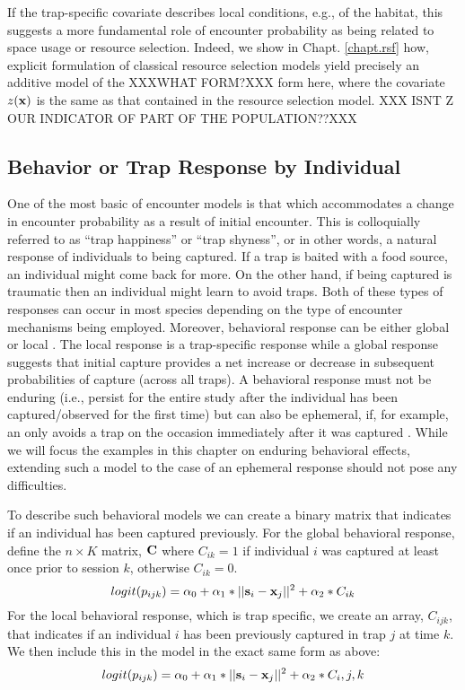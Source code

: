 If the trap-specific covariate describes local conditions, e.g., of
the habitat, this suggests a more fundamental role of encounter
probability as being related to space usage or resource
selection. Indeed, we show in Chapt. \ref{chapt.rsf} how, explicit
formulation of classical resource selection models yield precisely an
additive model of the XXXWHAT FORM?XXX form here, where the covariate
$z({\bf x})$ is the same as that contained in the resource selection
model. XXX ISNT Z OUR INDICATOR OF PART OF THE POPULATION??XXX









\subsection{Behavior or Trap Response by Individual}

One of the most basic of encounter models is that which accommodates a
change in encounter probability as a result of initial encounter.
This is colloquially referred to as ``trap happiness'' or ``trap shyness'', or in other words, a
natural response of individuals to being captured. If a trap is baited
with a food source, an individual might come back for
more. On the other hand, if being captured is traumatic then an
individual might learn to avoid traps. Both of these types of
responses can occur in most species depending on the type of encounter
mechanisms being employed. Moreover, behavioral response can be either
global \citep{gardner_etal:2010} or local \citep{royle_etal:2009jwm}.
The local response is a trap-specific response 
while a global response suggests that
initial capture provides a net increase or decrease in subsequent probabilities of capture (across all
traps). A behavioral response must not be enduring (i.e., persist for the entire study after the individual has been captured/observed for the first time) but can also be ephemeral, if, for example, an only avoids a trap on the occasion immediately after it was captured \citep{royle:2008B, yang_chao:2005}. While we will focus the examples in this chapter on enduring behavioral effects, extending such a model to the case of an ephemeral response should not pose any difficulties. 

To describe such behavioral models we can create a binary matrix that indicates
if an individual has been captured previously.  For the global
behavioral response, define the $n \times K$ matrix,
${\bf C}$ where $C_{ik} =1$
if individual $i$ was captured at least once prior to session
$k$, otherwise $C_{ik} = 0$.
\[
logit(p_{ijk}) = \alpha_{0} + \alpha_1 *||{\bf s}_{i}-{\bf x}_{j}||^{2} + \alpha_2*C_{ik}
\]
For the local behavioral response, which is trap specific, we create
an array, $C_{ijk}$, that indicates if an individual $i$ has been
previously captured in trap $j$ at time $k$.  We then include this in
the model in the exact same form as above:
\[
logit(p_{ijk}) = \alpha_{0} + \alpha_1*||{\bf s}_{i}-{\bf x}_{j}||^{2} + \alpha_2*C_i,j,k
\]


